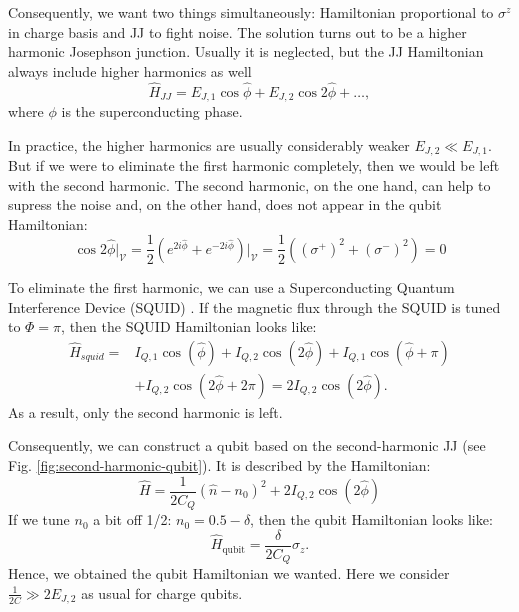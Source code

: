 \documentclass[reprint, aps, prx, amsmath, amssymb, longbibliography, superscriptaddress]{revtex4-2}
\begin{document}
Consequently, we want two things simultaneously: Hamiltonian proportional to $\sigma^z$ in charge basis and JJ to fight noise. The solution turns out to be a higher harmonic Josephson junction. Usually it is neglected, but the JJ Hamiltonian always include higher harmonics as well
\begin{equation}
    \hat H_{JJ} = E_{J,1} \cos{\hat \phi} + E_{J,2} \cos{2\hat \phi} + \dots,
\end{equation}
where $\phi$ is the superconducting phase.

In practice, the higher harmonics are usually considerably weaker $E_{J,2} \ll E_{J,1}$. But if we were to eliminate the first harmonic completely, then we would be left with the second harmonic. The second harmonic, on the one hand, can help to supress the noise and, on the other hand, does not appear in the qubit Hamiltonian:
\begin{equation}
    \cos{2\hat \phi}\bigg|_{\mathcal{V}} = \frac{1}{2}\left(e^{2i\hat\phi} + e^{-2i\hat \phi}\right)\bigg|_{\mathcal{V}}=\frac{1}{2}\left((\sigma^+)^2 + (\sigma^-)^2\right) =0
\end{equation}

To eliminate the first harmonic, we can use a Superconducting Quantum Interference Device (SQUID) \cite{valentini_parityconserving_2024}. If the magnetic flux through the SQUID is tuned to $\Phi = \pi$, then the SQUID Hamiltonian looks like:
\begin{equation}
\begin{aligned}
    \hat H_{squid} = &I_{Q,1} \cos(\hat \phi) + I_{Q,2} \cos(2\hat \phi) + I_{Q,1} \cos(\hat \phi + \pi) \\
    &+ I_{Q,2} \cos(2\hat \phi + 2\pi) = 2 I_{Q,2} \cos(2\hat \phi).
\end{aligned}
\end{equation}
As a result, only the second harmonic is left.

Consequently, we can construct a qubit based on the second-harmonic JJ (see Fig. \ref{fig:second-harmonic-qubit}). It is described by the Hamiltonian:
\begin{equation}
\label{eq:second-harmonic-qubit}
    \hat H = \frac{1}{2C_Q} (\hat n - n_0)^2 + 2 I_{Q,2} \cos(2\hat\phi)
\end{equation}
If we tune $n_0$ a bit off 1/2: $n_0 = 0.5 - \delta$, then the qubit Hamiltonian looks like:
\begin{equation}
    \hat H_{\text{qubit}} = \frac{\delta}{2 C_Q} \sigma_z.
\end{equation}
Hence, we obtained the qubit Hamiltonian we wanted. Here we consider $\frac{1}{2C} \gg 2 E_{J,2}$ as usual for charge qubits.
\end{document}
